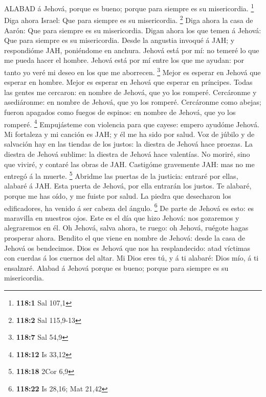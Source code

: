  ALABAD á Jehová, porque es bueno; porque para siempre es su
misericordia. \footnote{\textbf{118:1} Sal 107,1}  Diga
ahora Israel: Que para siempre es su misericordia. \footnote{\textbf{118:2}
  Sal 115,9-13}  Diga ahora la casa de Aarón: Que para
siempre es su misericordia.  Digan ahora los que temen á
Jehová: Que para siempre es su misericordia.  Desde la
angustia invoqué á JAH; y respondióme JAH, poniéndome en anchura.
 Jehová está por mí: no temeré lo que me pueda hacer el
hombre.  Jehová está por mí entre los que me ayudan: por
tanto yo veré mi deseo en los que me aborrecen. \footnote{\textbf{118:7}
  Sal 54,9}  Mejor es esperar en Jehová que esperar en
hombre.  Mejor es esperar en Jehová que esperar en
príncipes.  Todas las gentes me cercaron: en nombre de
Jehová, que yo los romperé.  Cercáronme y asediáronme: en
nombre de Jehová, que yo los romperé.  Cercáronme como
abejas; fueron apagados como fuegos de espinos: en nombre de Jehová, que
yo los romperé. \footnote{\textbf{118:12} Is 33,12} 
Empujásteme con violencia para que cayese: empero ayudóme Jehová.
 Mi fortaleza y mi canción es JAH; y él me ha sido por
salud.  Voz de júbilo y de salvación hay en las tiendas de
los justos: la diestra de Jehová hace proezas.  La diestra
de Jehová sublime: la diestra de Jehová hace valentías.  No
moriré, sino que viviré, y contaré las obras de JAH. 
Castigóme gravemente JAH: mas no me entregó á la muerte. \footnote{\textbf{118:18}
  2Cor 6,9}  Abridme las puertas de la justicia: entraré
por ellas, alabaré á JAH.  Esta puerta de Jehová, por ella
entrarán los justos.  Te alabaré, porque me has oído, y me
fuiste por salud.  La piedra que desecharon los
edificadores, ha venido á ser cabeza del ángulo. \footnote{\textbf{118:22}
  Is 28,16; Mat 21,42}  De parte de Jehová es esto: es
maravilla en nuestros ojos.  Este es el día que hizo
Jehová: nos gozaremos y alegraremos en él.  Oh Jehová,
salva ahora, te ruego: oh Jehová, ruégote hagas prosperar ahora.
 Bendito el que viene en nombre de Jehová: desde la casa de
Jehová os bendecimos.  Dios es Jehová que nos ha
resplandecido: atad víctimas con cuerdas á los cuernos del altar.
 Mi Dios eres tú, y á ti alabaré: Dios mío, á ti ensalzaré.
 Alabad á Jehová porque es bueno; porque para siempre es su
misericordia.

